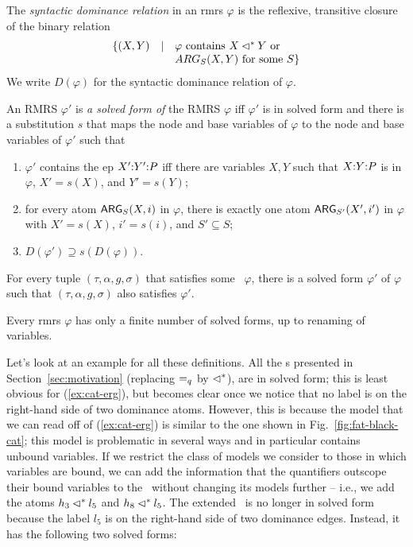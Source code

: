 \begin{definition}  \label{defn:solved-form-of}
  The \emph{syntactic dominance relation} in an {\sc  rmrs} $\varphi$ is the
  reflexive, transitive closure of the binary relation $$
\begin{array}{r c l}
\{(X,Y) & \mid &  \mbox{$\varphi$ contains $X \lhd^* Y$ or}\\
&& \mbox{$ARG_S(X,Y)$ for some
    $S$}\}
\end{array}
$$  
We write $D(\varphi)$ for the syntactic dominance
  relation of $\varphi$.

  An RMRS $\varphi'$ is \emph{a solved form of} the RMRS $\varphi$
  iff $\varphi'$ is in solved form and there is a substitution $s$
  that maps the  node and base variables of $\varphi$ to the node and
  base variables of $\varphi'$ such that
  \begin{enumerate}
  \item $\varphi'$ contains the {\sc ep} $X' {:} Y' {:} P$ iff there are
    variables $X,Y$ such that $X {:} Y {:} P$ is in $\varphi$, $X' =
    s(X)$, and $Y' = s(Y)$;
  \item for every atom $\mathsf{ARG}_S(X,i)$ in $\varphi$, there is exactly
    one atom $\mathsf{ARG}_{S'}(X',i')$ in $\varphi$ with $X' = s(X)$, $i' =
    s(i)$, and $S' \subseteq S$;
  \item $D(\varphi') \supseteq s(D(\varphi))$.
  \end{enumerate}
\end{definition}

\begin{prop} \label{prop:models-satisfy-solved-forms}
  For every tuple $(\tau,\alpha,g,\sigma)$ that satisfies some \rmrs\
  $\varphi$, there is a solved form $\varphi'$ of $\varphi$ such that
  $(\tau,\alpha,g,\sigma)$ also satisfies $\varphi'$.
\end{prop}

\begin{prop}  \label{prop:finite-solved-forms}
  Every {\sc rmrs} $\varphi$ has only a finite number of solved forms, up to
  renaming of variables.
\end{prop}

Let's look at an example for all these definitions.  All the \rmrs s
presented in Section~\ref{sec:motivation} (replacing $=_q$ by
$\lhd^*$), are in solved form; this is least obvious for
(\ref{ex:cat-erg}), but becomes clear once we notice that no label is
on the right-hand side of two dominance atoms.  However, this is
because the model that we can read off of (\ref{ex:cat-erg}) is
similar to the one shown in Fig.~\ref{fig:fat-black-cat}; this model
is problematic in several ways and in particular contains unbound
variables.  If we restrict the class of models we consider to those in
which variables are bound, we can add the information that the
quantifiers outscope their bound variables to the \rmrs\ without
changing its models further -- i.e., we add the atoms $h_3 \lhd^*
l_5$ and $h_8 \lhd^* l_5$.  The extended \rmrs\ is no longer in solved
form because the label $l_5$ is on the right-hand side of two
dominance edges.  Instead, it has the following two solved forms:

